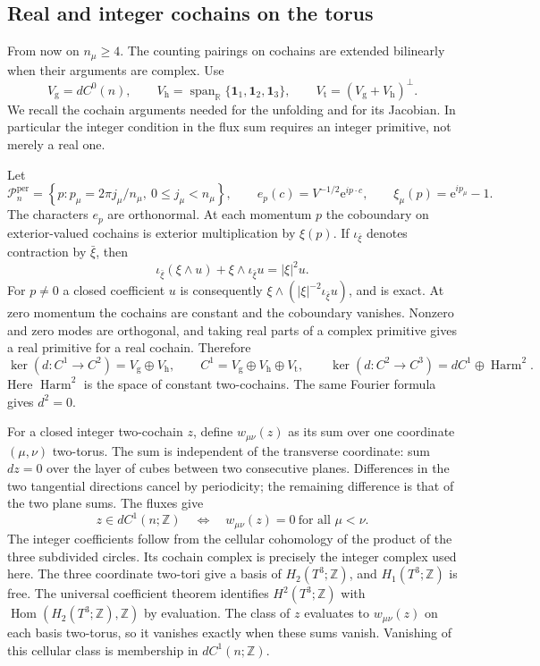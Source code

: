 \documentclass[11pt,letterpaper,reqno]{amsart}
\newcommand{\R}{\mathbb R}
\newcommand{\Z}{\mathbb Z}
\begin{document}
\subsection{Real and integer cochains on the torus}
\label{subsec:external-cochains}

From now on $n_\mu\ge4$. The counting pairings on cochains
are extended bilinearly when their arguments are complex.
Use
\[
 V_{\mathrm g}=dC^0(n),\qquad
 V_{\mathrm h}=\operatorname{span}_{\R}\{\mathbf1_1,\mathbf1_2,\mathbf1_3\},
 \qquad
 V_{\mathrm t}=(V_{\mathrm g}+V_{\mathrm h})^\perp.
\]
We recall the cochain arguments needed for the unfolding and
for its Jacobian. In particular the integer condition in the
flux sum requires an integer primitive, not merely a real one.

Let
\[
 \mathcal P_n^{\mathrm{per}}=
   \left\{p:p_\mu=2\pi j_\mu/n_\mu,\ 0\le j_\mu<n_\mu\right\},
 \qquad e_p(c)=V^{-1/2}\mathrm e^{ip\cdot c},\qquad
 \xi_\mu(p)=\mathrm e^{ip_\mu}-1.
\]
The characters $e_p$ are orthonormal. At each momentum $p$ the
coboundary on exterior-valued cochains is exterior multiplication
by $\xi(p)$. If $\iota_{\bar\xi}$ denotes contraction by $\bar\xi$,
then
\[
 \iota_{\bar\xi}(\xi\wedge u)+
                  \xi\wedge\iota_{\bar\xi}u=|\xi|^2u.
\]
For $p\ne0$ a closed coefficient $u$ is consequently
$\xi\wedge(|\xi|^{-2}\iota_{\bar\xi}u)$, and is exact.
At zero momentum the cochains are constant and the
coboundary vanishes. Nonzero and zero modes are orthogonal,
and taking real parts of a complex primitive gives a real
primitive for a real cochain. Therefore
\begin{equation}\label{eq:external-Hodge}
 \ker(d:C^1\to C^2)=V_{\mathrm g}\oplus V_{\mathrm h},
 \qquad C^1=V_{\mathrm g}\oplus V_{\mathrm h}\oplus V_{\mathrm t},
 \qquad
 \ker(d:C^2\to C^3)=dC^1\oplus\operatorname{Harm}^2.
\end{equation}
Here $\operatorname{Harm}^2$ is the space of constant two-cochains.
The same Fourier formula gives $d^2=0$.

For a closed integer two-cochain $z$, define
$w_{\mu\nu}(z)$ as its sum over one coordinate $(\mu,\nu)$
two-torus. The sum is independent of the transverse coordinate:
sum $dz=0$ over the layer of cubes between two consecutive
planes. Differences in the two tangential directions cancel
by periodicity; the remaining difference is that of the two
plane sums. The fluxes give
\begin{equation}\label{eq:external-integer-two-exactness}
 z\in dC^1(n;\Z)\quad\Longleftrightarrow\quad
                         w_{\mu\nu}(z)=0\ \text{for all }\mu<\nu.
\end{equation}
The integer coefficients follow from the
cellular cohomology of the product of the three subdivided
circles. Its cochain complex is precisely the integer complex
used here. The three coordinate two-tori give a basis of
$H_2(T^3;\Z)$, and $H_1(T^3;\Z)$ is free. The universal
coefficient theorem identifies $H^2(T^3;\Z)$ with
$\operatorname{Hom}(H_2(T^3;\Z),\Z)$ by evaluation.
The class of $z$ evaluates to $w_{\mu\nu}(z)$ on each basis
two-torus, so it vanishes exactly when these sums vanish.
Vanishing of this cellular class is membership in
$dC^1(n;\Z)$.
\cite[Theorems~3.2, 3.5 and~3B.6]{Hatcher2002}
\end{document}
